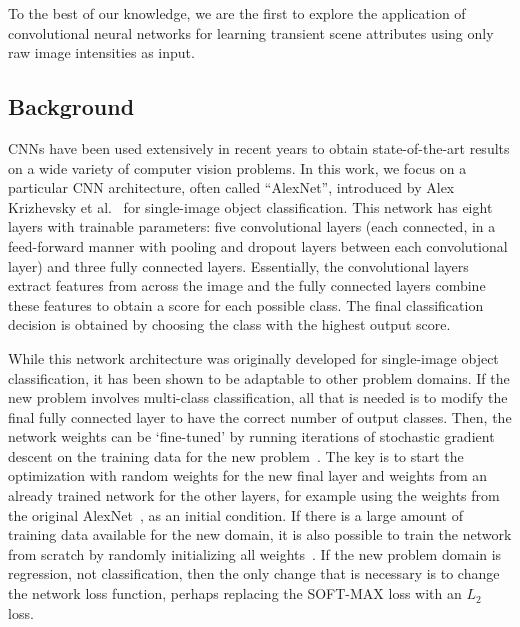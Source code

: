 \documentclass[10pt,twocolumn,letterpaper]{article}
\begin{document}
To the best of our knowledge, we are the first to explore the application of
convolutional neural networks for learning transient scene attributes
using only raw image intensities as input.

\subsection{Background}

CNNs have been used extensively in recent
years to obtain state-of-the-art results on a wide variety of computer vision
problems.  In this work, we focus on a particular CNN architecture, often
called ``AlexNet'', introduced by Alex Krizhevsky et al.~\cite{caffenetnips12}
for single-image object classification. This network has eight layers with
trainable parameters: five convolutional layers (each connected, in a
feed-forward manner with pooling and dropout layers between each convolutional
layer) and three fully connected layers. Essentially, the convolutional layers
extract features from across the image and the fully connected layers combine
these features to obtain a score for each possible class. The final
classification decision is obtained by choosing the class with the highest
output score.

While this network architecture was originally developed for single-image
object classification, it has been shown to be adaptable to other problem
domains. If the new problem involves multi-class classification, all that is
needed is to modify the final fully connected layer to have the correct number
of output classes. Then, the network weights can be `fine-tuned' by running
iterations of stochastic gradient descent on the training data for the new
problem~\cite{yosinski2014transferable}.  The key is to start the optimization
with random weights for the new final layer and weights from an already trained
network for the other layers, for example using the weights from the original
AlexNet~\cite{caffenetnips12}, as an initial condition. If there is a large
amount of training data available for the new domain, it is also possible to
train the network from scratch by randomly initializing all
weights~\cite{zhou2014places}.  If the new problem domain is regression, not
classification, then the only change that is necessary is to change the network
loss function, perhaps replacing the SOFT-MAX loss with an $L_2$ loss.
\end{document}
